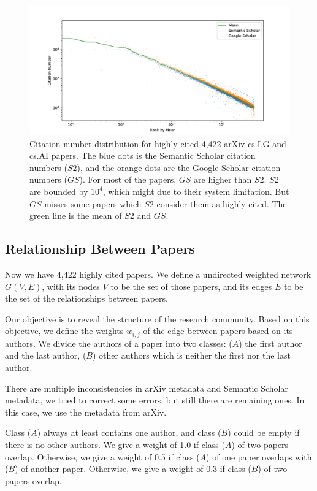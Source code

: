 \begin{figure}
    \centering
    \includegraphics[width=\textwidth]{images/citation_number_distribution.pdf}
    \caption{Citation number distribution for highly cited 4,422 arXiv cs.LG and cs.AI papers. 
    The blue dots is the Semantic Scholar citation numbers ($S2$), 
    and the orange dots are the Google Scholar citation numbers ($GS$). 
    For most of the papers, $GS$ are higher than $S2$.
    $S2$ are bounded by $10^4$, which might due to their system limitation.
    But $GS$ misses some papers which $S2$ consider them as highly cited.
    The green line is the mean of $S2$ and $GS$.
    }
    \label{fig:distribution}
\end{figure}

\subsection{Relationship Between Papers}

Now we have 4,422 highly cited papers.
We define a undirected weighted network $G(V,E)$, with its nodes $V$ to be the set of those papers, and its edges $E$ to be the set of the relationships between papers.

Our objective is to reveal the structure of the research community.
Based on this objective, we define the weights $w_{i,j}$ of the edge between papers based on its authors.
We divide the authors of a paper into two classes: ($A$) the first author and the last author, ($B$) other authors which is neither the first nor the last author.

There are multiple inconsistencies in arXiv metadata and Semantic Scholar metadata, we tried to correct some errors, but still there are remaining ones.
In this case, we use the metadata from arXiv.

Class ($A$) always at least contains one author, and class ($B$) could be empty if there is no other authors.
We give a weight of 1.0 if class ($A$) of two papers overlap.
Otherwise, we give a weight of 0.5 if class ($A$) of one paper overlaps with ($B$) of another paper.
Otherwise, we give a weight of 0.3 if class ($B$) of two papers overlap.

